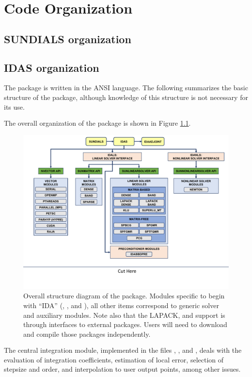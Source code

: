 \chapter{Code Organization}\label{s:organization}

\section{SUNDIALS organization}\label{ss:sun_org}


\section{IDAS organization}\label{ss:idas_org}

The {\idas} package is written in the ANSI {\CC} language. The following
summarizes the basic structure of the package, although knowledge
of this structure is not necessary for its use.

The overall organization of the {\idas} package is shown in Figure
\ref{f:idasorg}.
\begin{figure}
{\centerline{\includegraphics[width=\textwidth]{idasorg}}}
\caption [Overall structure diagram of the {\ida} package]
{Overall structure diagram of the {\ida} package.
  Modules specific to {\ida} begin with ``IDA'' ({\idals},
  {\idabbdpre}, and {\idanls}), all other items correspond
  to generic solver and auxiliary modules. 
  Note also that the LAPACK, {\klu} and {\superlumt} support is
  through interfaces to external packages. 
  Users will need to download and compile those packages independently.}
\label{f:idasorg}
\end{figure}
The central integration module, implemented in the files ,
, and , deals with the evaluation of integration 
coefficients, estimation of local error,
selection of stepsize and order, and interpolation to user output
points, among other issues.

